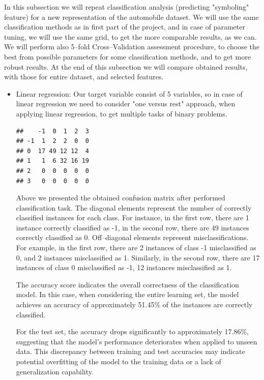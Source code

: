 \documentclass[11pt,a4paper]{article}\usepackage[]{graphicx}\usepackage[]{xcolor}
\makeatletter
\newenvironment{kframe}{%
 \def\at@end@of@kframe{}%
 \ifinner\ifhmode%
  \def\at@end@of@kframe{\end{minipage}}%
  \begin{minipage}{\columnwidth}%
 \fi\fi%
 \def\FrameCommand##1{\hskip\@totalleftmargin \hskip-\fboxsep
 \colorbox{shadecolor}{##1}\hskip-\fboxsep
     \hskip-\linewidth \hskip-\@totalleftmargin \hskip\columnwidth}%
 \MakeFramed {\advance\hsize-\width
   \@totalleftmargin\z@ \linewidth\hsize
   \@setminipage}}%
 {\par\unskip\endMakeFramed%
 \at@end@of@kframe}
\newenvironment{knitrout}{}{} %
\makeatother
\begin{document}
	 In this subsection we will repeat classification analysis (predicting "symboling" feature) for a new representation of the automobile dataset. We will use the same classification methods as in first part of the project, and in case of parameter tuning, we will use the same grid, to get the more comparable results, as we can. We will perform also 5--fold Cross--Validation assessment procedure, to choose the best from possible parameters for some classification methods, and to get more robust results. At the end of this subsection we will compare obtained results, with those for entire dataset, and selected features.
	 
	 \begin{itemize}
	 	\item Linear regression:
	 	Our target variable consist of 5 variables, so in case of linear regression we need to consider "one versus rest" approach, when applying linear regression, to get multiple tasks of binary problems.
	 	
\begin{knitrout}
\color{fgcolor}\begin{kframe}
\begin{verbatim}
##    -1  0  1  2  3
## -1  1  2  2  0  0
## 0  17 49 12 12  4
## 1   1  6 32 16 19
## 2   0  0  0  0  0
## 3   0  0  0  0  0
\end{verbatim}
\end{kframe}
\end{knitrout}
	 	

	 	Above we presented the obtained confusion matrix after performed classification task. The diagonal elements  represent the number of correctly classified instances for each class. For instance, in the first row, there are 1 instance correctly classified as -1, in the second row, there are 49 instances correctly classified as 0.
Off--diagonal elements represent misclassifications. For example, in the first row, there are 2 instances of class -1 misclassified as 0, and 2 instances misclassified as 1. Similarly, in the second row, there are 17 instances of class 0 misclassified as -1, 12 instances misclassified as 1.


The accuracy score indicates the overall correctness of the classification model. In this case, when considering the entire learning set, the model achieves an accuracy of approximately 51.45\% of the instances are correctly classified.

For the test set, the accuracy drops significantly to approximately 17.86\%, suggesting that the model's performance deteriorates when applied to unseen data. This discrepancy between training and test accuracies may indicate potential overfitting of the model to the training data or a lack of generalization capability.


\end{itemize}
\end{document}
